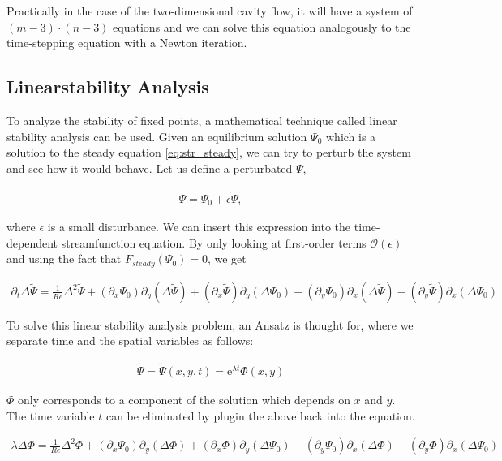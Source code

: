 Practically in the case of the two-dimensional cavity flow, it will have a
system of $(m-3) \cdot (n-3)$ equations and we can solve this equation
analogously to the time-stepping equation with a Newton iteration.

\subsection{Linearstability Analysis}

To analyze the stability of fixed points, a mathematical technique called
linear stability analysis can be used. Given an equilibrium solution $\Psi_0$
which is a solution to the steady equation \ref{eq:str_steady}, we can try to
perturb the system and see how it would behave. Let us define a perturbated
$\Psi$,

\begin{align}
\Psi = \Psi_0 + \epsilon \tilde{\Psi},
\end{align}

where $\epsilon$ is a small disturbance. We can insert this expression into the
time-dependent streamfunction equation. By only looking at first-order terms
$\mathcal{O}(\epsilon)$ and using the fact that $F_{steady}(\Psi_0) = 0$, we
get

\begin{align}
\partial_t \Delta \tilde{\Psi} = \frac{1}{Re} \Delta^2 \tilde{\Psi}
  + (\partial_x \Psi_0) \partial_y (\Delta \tilde{\Psi})
  + (\partial_x \tilde{\Psi}) \partial_y (\Delta \Psi_0)
  - (\partial_y \Psi_0) \partial_x (\Delta \tilde{\Psi})
  - (\partial_y \tilde{\Psi}) \partial_x (\Delta \Psi_0)
\label{eq:str_pert}
\end{align}

To solve this linear stability analysis problem, an Ansatz is thought for,
where we separate time and the spatial variables as follows: 

\begin{align}
  \tilde{\Psi} = \tilde{\Psi}(x,y,t) = \mathrm{e}^{\lambda t} \Phi(x,y)
\end{align}

$\Phi$ only corresponds to a component of the solution which depends on $x$ and
$y$. The time variable $t$ can be eliminated by plugin the above back into the
equation.

\begin{align}
\lambda \Delta \Phi = \frac{1}{Re} \Delta^2 \Phi
  + (\partial_x \Psi_0) \partial_y (\Delta \Phi)
  + (\partial_x \Phi) \partial_y (\Delta \Psi_0)
  - (\partial_y \Psi_0) \partial_x (\Delta \Phi)
  - (\partial_y \Phi) \partial_x (\Delta \Psi_0)
\label{eq:str_phi}
\end{align}

